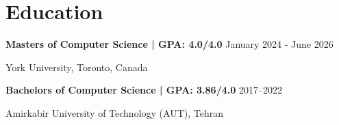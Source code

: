 \renewcommand{\subsection}[3]{
    \noindent\textbf{#1}  \emph{#2} \hfill #3 \break
}
\section{Education}
\subsection{Masters of Computer Science | GPA: 4.0/4.0}{}{January 2024 - June 2026}
York University, Toronto, Canada

\subsection{Bachelors of Computer Science | GPA: 3.86/4.0}{}{2017--2022}
Amirkabir University of Technology (AUT), Tehran


